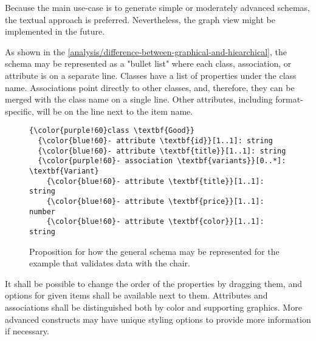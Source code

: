 Because the main use-case is to generate simple or moderately advanced schemas, the textual approach is preferred. Nevertheless, the graph view might be implemented in the future.

\medskip

As shown in the \autoref{analysis/difference-between-graphical-and-hiearchical}, the schema may be represented as a "bullet list" where each class, association, or attribute is on a separate line. Classes have a list of properties under the class name. Associations point directly to other classes, and, therefore, they can be merged with the class name on a single line. Other attributes, including format-specific, will be on the line next to the item name.

\begin{figure}[h!]\centering
  \begin{Verbatim}[commandchars=\\\{\}]
{\color{purple!60}class \textbf{Good}}
  {\color{blue!60}- attribute \textbf{id}}[1..1]: string
  {\color{blue!60}- attribute \textbf{title}}[1..1]: string
  {\color{purple!60}- association \textbf{variants}}[0..*]: \textbf{Variant}
    {\color{blue!60}- attribute \textbf{title}}[1..1]: string
    {\color{blue!60}- attribute \textbf{price}}[1..1]: number
    {\color{blue!60}- attribute \textbf{color}}[1..1]: string
\end{Verbatim}
  \caption{Proposition for how the general schema may be represented for the example that validates data with the chair.}
  \label{analysis/general-schema-representation}
\end{figure}

It shall be possible to change the order of the properties by dragging them, and options for given items shall be available next to them. Attributes and associations shall be distinguished both by color and supporting graphics. More advanced constructs may have unique styling options to provide more information if necessary.